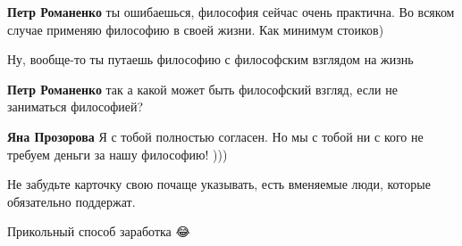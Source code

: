 \begin{itemize}
\begin{itemize}
 
\textbf{Петр Романенко} ты ошибаешься, философия сейчас очень практична. Во всяком случае применяю философию в своей жизни. Как минимум стоиков)

 
Ну, вообще-то ты путаешь философию с философским взглядом на жизнь

 
\textbf{Петр Романенко} так а какой может быть философский взгляд, если не заниматься философией?

 
\textbf{Яна Прозорова} Я с тобой полностью согласен. Но мы с тобой ни с кого не требуем деньги за нашу философию! )))
\end{itemize}

 
Не забудьте карточку свою почаще указывать, есть вменяемые люди, которые обязательно поддержат.

\begin{itemize}
 
Прикольный способ заработка 😂

 

\end{itemize}
\end{itemize}
